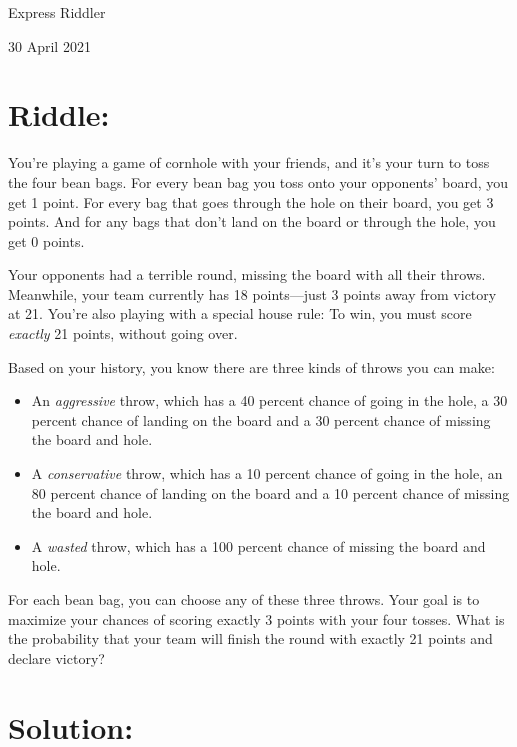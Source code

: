 \documentclass{article}
\begin{document}
\pagestyle{empty} %

\begin{center}
{\LARGE Express Riddler}

\vspace{0.15in}

{\Large 30 April 2021}
\end{center}


\section*{Riddle:}

You're playing a game of cornhole with your friends, and it's your turn to toss the four bean bags.
For every bean bag you toss onto your opponents' board, you get 1 point.
For every bag that goes through the hole on their board, you get 3 points.
And for any bags that don't land on the board or through the hole, you get 0 points.

Your opponents had a terrible round, missing the board with all their throws.
Meanwhile, your team currently has 18 points---just 3 points away from victory at 21.
You're also playing with a special house rule: To win, you must score \textit{exactly} 21 points, without going over.

Based on your history, you know there are three kinds of throws you can make:

\begin{itemize}
\item An \textit{aggressive} throw, which has a 40 percent chance of going in the hole, a 30 percent chance of landing on the board and a 30 percent chance of missing the board and hole.
\item A \textit{conservative} throw, which has a 10 percent chance of going in the hole, an 80 percent chance of landing on the board and a 10 percent chance of missing the board and hole.
\item A \textit{wasted} throw, which has a 100 percent chance of missing the board and hole.
\end{itemize}

For each bean bag, you can choose any of these three throws.
Your goal is to maximize your chances of scoring exactly 3 points with your four tosses. What is the probability that your team will finish the round with exactly 21 points and declare victory?



\section*{Solution:}
\end{document}
